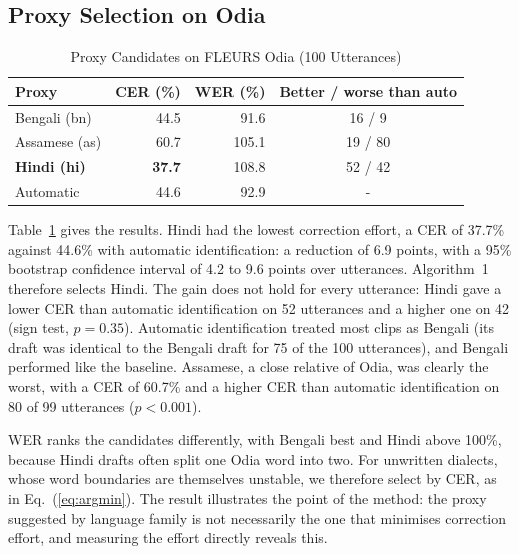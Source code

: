 \documentclass[conference]{IEEEtran}
\begin{document}
\subsection{Proxy Selection on Odia}
\begin{table}[t]
\caption{Proxy Candidates on FLEURS Odia (100 Utterances)}
\label{tab:fleurs}
\centering
\begin{tabular}{lrrc}
\toprule
Proxy & CER (\%) & WER (\%) & Better / worse than auto \\
\midrule
Bengali (bn) & 44.5 & 91.6 & 16 / 9 \\
Assamese (as) & 60.7 & 105.1 & 19 / 80 \\
\textbf{Hindi (hi)} & \textbf{37.7} & 108.8 & 52 / 42 \\
Automatic & 44.6 & 92.9 & - \\
\bottomrule
\end{tabular}
\end{table}
Table~\ref{tab:fleurs} gives the results. Hindi had the lowest correction effort, a CER of 37.7\% against 44.6\% with automatic identification: a reduction of 6.9 points, with a 95\% bootstrap confidence interval of 4.2 to 9.6 points over utterances. Algorithm~1 therefore selects Hindi. The gain does not hold for every utterance: Hindi gave a lower CER than automatic identification on 52 utterances and a higher one on 42 (sign test, $p = 0.35$). Automatic identification treated most clips as Bengali (its draft was identical to the Bengali draft for 75 of the 100 utterances), and Bengali performed like the baseline. Assamese, a close relative of Odia, was clearly the worst, with a CER of 60.7\% and a higher CER than automatic identification on 80 of 99 utterances ($p < 0.001$).

WER ranks the candidates differently, with Bengali best and Hindi above 100\%, because Hindi drafts often split one Odia word into two. For unwritten dialects, whose word boundaries are themselves unstable, we therefore select by CER, as in Eq.~(\ref{eq:argmin}). The result illustrates the point of the method: the proxy suggested by language family is not necessarily the one that minimises correction effort, and measuring the effort directly reveals this.
\end{document}
